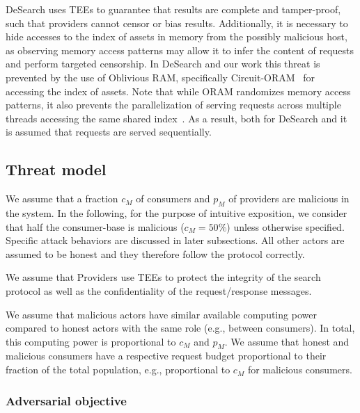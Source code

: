 DeSearch uses TEEs to guarantee that results are complete and tamper-proof, such that providers cannot censor or bias results.
Additionally, it is necessary to hide accesses to the index of assets in memory from the possibly malicious host, as observing memory access patterns may allow it to infer the content of requests and perform targeted censorship.
In DeSearch and our work this threat is prevented by the use of Oblivious RAM, specifically Circuit-ORAM~\cite{wangCircuitORAMTightness2015} for accessing the index of assets.
Note that while ORAM randomizes memory access patterns, it also prevents the parallelization of serving requests across multiple threads accessing the same shared index~\cite{wangCircuitORAMTightness2015}.
As a result, both for DeSearch and \sysname it is assumed that requests are served sequentially.

\subsection{Threat model}

We assume that a fraction $c_{M}$ of consumers and $p_{M}$ of providers are malicious in the system. 
In the following, for the purpose of intuitive exposition, we consider that half the consumer-base is malicious ($c_{M}=50\%$) unless otherwise specified.
Specific attack behaviors are discussed in later subsections.
All other actors are assumed to be honest and they therefore follow the protocol correctly.

We assume that Providers use TEEs to protect the integrity of the search protocol as well as the confidentiality of the request/response messages. 

We assume that malicious actors have similar available computing power compared to honest actors with the same role (e.g., between consumers).
In total, this computing power is proportional to $c_{M}$ and $p_{M}$. 
We assume that honest and malicious consumers have a respective request budget proportional to their fraction of the total population, e.g., proportional to $c_{M}$ for malicious consumers. 

\subsubsection{Adversarial objective}

